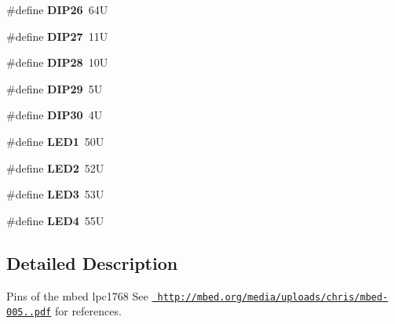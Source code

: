 \begin{DoxyCompactItemize}
\#define {\bfseries D\+I\+P26}~64U
\item 
\mbox{\label{mbed-pinmap_8h_a40f956ba0f14f7e6ae3d3693047da532}} 
\#define {\bfseries D\+I\+P27}~11U
\item 
\mbox{\label{mbed-pinmap_8h_acc3afc2a842a929284d329f3af32e88f}} 
\#define {\bfseries D\+I\+P28}~10U
\item 
\mbox{\label{mbed-pinmap_8h_ab27fec5a2b63e5eea40b1f1fca079aa6}} 
\#define {\bfseries D\+I\+P29}~5U
\item 
\mbox{\label{mbed-pinmap_8h_a7fdfb1dc3eaaf76996438c86cc0f55a7}} 
\#define {\bfseries D\+I\+P30}~4U
\item 
\mbox{\label{mbed-pinmap_8h_a8aa85ae9867fabf70ec72cd3bf6fb6b9}} 
\#define {\bfseries L\+E\+D1}~50U
\item 
\mbox{\label{mbed-pinmap_8h_ad09fe5bf321b9a2de26bd5e5b9af6424}} 
\#define {\bfseries L\+E\+D2}~52U
\item 
\mbox{\label{mbed-pinmap_8h_a4b7ff8e253a7412f83deba3a447028a8}} 
\#define {\bfseries L\+E\+D3}~53U
\item 
\mbox{\label{mbed-pinmap_8h_ae048837f20072bed467332b1bd1da9fa}} 
\#define {\bfseries L\+E\+D4}~55U
\end{DoxyCompactItemize}


\subsection{Detailed Description}
Pins of the mbed lpc1768 See \href{http://mbed.org/media/uploads/chris/mbed-005.1.pdf}{\texttt{ http\+://mbed.\+org/media/uploads/chris/mbed-\/005..\+pdf}} for references. 

